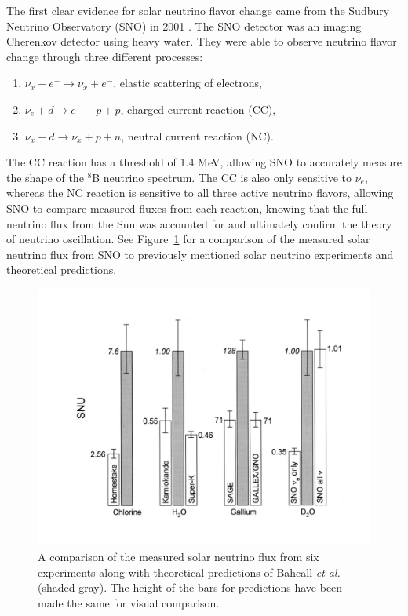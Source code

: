 The first clear evidence for solar neutrino flavor change came from the Sudbury Neutrino Observatory (SNO) in 2001 \cite{SNO,SNOOsc}. 
The SNO detector was an imaging Cherenkov detector using heavy water.
They were able to observe neutrino flavor change through three different processes:
 \renewcommand{\labelenumi}{(\roman{enumi})}
\begin{enumerate}
	\centering
	\item  ${\nu_x + {e^-} \rightarrow \nu_x + {e^-}}$, elastic scattering of electrons,
	\item $\nu_e + d \rightarrow {e^-} + p + p$, charged current reaction (CC),
	\item $\nu_x + d \rightarrow \nu_x + p+ n$, neutral current reaction (NC).
\end{enumerate}
The CC reaction has a threshold of 1.4 MeV, allowing SNO to accurately measure the shape of the $^{8}$B neutrino spectrum.
The CC is also only sensitive to $\nu_{e}$, whereas the NC reaction is sensitive to all three active neutrino flavors, allowing SNO to compare measured fluxes from each reaction, knowing that the full neutrino flux from the Sun was accounted for
 and ultimately confirm the theory of neutrino oscillation.
See Figure~\ref{fig:expsolarflux} for a comparison of the measured solar neutrino flux from SNO to previously mentioned solar neutrino experiments and theoretical predictions.

\begin{figure}[t!]
	\centering
	\includegraphics[width=0.6\linewidth]{tex/2-neutrinos-images/ExpSolarFlux}
	\caption{A comparison of the measured solar neutrino flux from six experiments along with theoretical predictions of Bahcall \textit{et al.} \cite{Bahcall:2000nu} (shaded gray). The height of the bars for predictions have been made the same for visual comparison. \cite{RevModPhys.75.985}}
	\label{fig:expsolarflux}
\end{figure}


